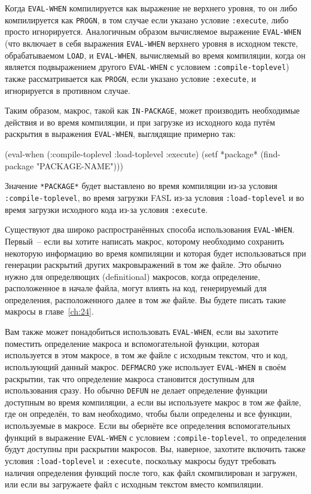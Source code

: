 Когда \lstinline{EVAL-WHEN} компилируется как выражение не верхнего уровня, то он либо
компилируется как \lstinline{PROGN}, в том случае если указано условие
\lstinline{:execute}, либо просто игнорируется.  Аналогичным образом вычисляемое
выражение \lstinline{EVAL-WHEN} (что включает в себя выражения \lstinline{EVAL-WHEN}
верхнего уровня в исходном тексте, обрабатываемом \lstinline{LOAD}, и
\lstinline{EVAL-WHEN}, вычисляемый во время компиляции, когда он является подвыражением
другого \lstinline{EVAL-WHEN} с условием \lstinline{:compile-toplevel}) также
рассматривается как \lstinline{PROGN}, если указано условие \lstinline{:execute}, и
игнорируется в противном случае.

Таким образом, макрос, такой как \lstinline{IN-PACKAGE}, может производить необходимые действия
и во время компиляции, и при загрузке из исходного кода путём раскрытия в выражения
\lstinline{EVAL-WHEN}, выглядящие примерно так:

\begin{myverb}
(eval-when (:compile-toplevel :load-toplevel :execute)
  (setf *package* (find-package "PACKAGE-NAME")))
\end{myverb}

Значение \lstinline{*PACKAGE*} будет выставлено во время компиляции из-за условия
\lstinline{:compile-toplevel}, во время загрузки FASL из-за условия \lstinline{:load-toplevel} и во
время загрузки исходного кода из-за условия \lstinline{:execute}.

Существуют два широко распространённых способа использования \lstinline{EVAL-WHEN}. Первый~--
если вы хотите написать макрос, которому необходимо сохранить некоторую информацию во
время компиляции и которая будет использоваться при генерации раскрытий других
макровыражений в том же файле.  Это обычно нужно для определяющих (definitional)
макросов, когда определение, расположенное в начале файла, могут влиять на код,
генерируемый для определения, расположенного далее в том же файле.  Вы будете писать такие
макросы в главе~\ref{ch:24}.

Вам также может понадобиться использовать \lstinline{EVAL-WHEN}, если вы захотите поместить
определение макроса и вспомогательной функции, которая используется в этом макросе, в том
же файле с исходным текстом, что и код, использующий данный макрос. \lstinline{DEFMACRO} уже
использует \lstinline{EVAL-WHEN} в своём раскрытии, так что определение макроса становится
доступным для использования сразу.  Но обычно \lstinline{DEFUN} не делает определение функции
доступным во время компиляции, а если вы используете макрос в том же файле, где он
определён, то вам необходимо, чтобы были определены и все функции, используемые в
макросе. Если вы обернёте все определения вспомогательных функций в выражение
\lstinline{EVAL-WHEN} с условием \lstinline{:compile-toplevel}, то определения будут доступны при
раскрытии макросов. Вы, наверное, захотите включить также условия \lstinline{:load-toplevel} и
\lstinline{:execute}, поскольку макросы будут требовать наличия определения функций после того,
как файл скомпилирован и загружен, или если вы загружаете файл с исходным текстом вместо
компиляции.

